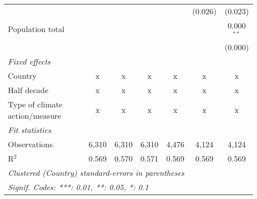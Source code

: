 \begin{tabular}{lcccccc}
                                                                             &             &                &                &                & (0.026)        & (0.023)\\   
   Population total                                                          &             &                &                &                &                & 0.000$^{**}$\\   
                                                                             &             &                &                &                &                & (0.000)\\   
   \emph{Fixed effects}\\
   Country                                                                   & x           & x              & x              & x              & x              & x\\  
   Half decade                                                               & x           & x              & x              & x              & x              & x\\  
   Type of climate action/measure                                            & x           & x              & x              & x              & x              & x\\  
   \midrule \emph{Fit statistics}\\
   Observations                                                              & 6,310       & 6,310          & 6,310          & 4,476          & 4,124          & 4,124\\  
   R$^2$                                                                     & 0.569       & 0.570          & 0.571          & 0.569          & 0.569          & 0.569\\  
   \midrule
   \multicolumn{7}{l}{\emph{Clustered (Country) standard-errors in parentheses}}\\
   \multicolumn{7}{l}{\emph{Signif. Codes: ***: 0.01, **: 0.05, *: 0.1}}\\
\end{tabular}
\par\endgroup


